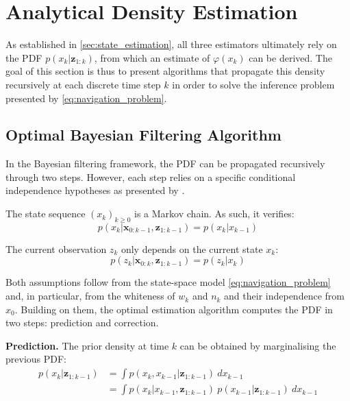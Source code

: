 \section{Analytical Density Estimation}\label{sec:analytical_estimation}

As established in \cref{sec:state_estimation}, all three estimators ultimately rely on the PDF $p(x_k|\mathbf{z}_{1:k})$, from which an estimate of $\varphi(x_k)$ can be derived. The goal of this section is thus to present algorithms that propagate this density recursively at each discrete time step $k$ in order to solve the inference problem presented by \eqref{eq:navigation_problem}.

\subsection{Optimal Bayesian Filtering Algorithm}

In the Bayesian filtering framework, the PDF can be propagated recursively through two steps. However, each step relies on a specific conditional independence hypotheses as presented by .

\begin{assumption}\label{th:Markov}
	The state sequence $(x_k)_{k\geq0}$ is a Markov chain. As such, it verifies:
	\begin{equation}
		p(x_k|\mathbf{x}_{0:k-1},\mathbf{z}_{1:k-1})=p(x_k|x_{k-1})
	\end{equation}
\end{assumption}

\begin{assumption}\label{th:observation_independence}
	The current observation $z_k$ only depends on the current state $x_k$:
	\begin{equation}
		p(z_k|\mathbf{x}_{0:k},\mathbf{z}_{1:k-1})=p(z_k|x_k)
	\end{equation}
\end{assumption}

Both assumptions follow from the state-space model \eqref{eq:navigation_problem} and, in particular, from the whiteness of $w_k$ and $n_k$ and their independence from $x_0$. Building on them, the optimal estimation algorithm computes the PDF in two steps: prediction and correction.

\textbf{Prediction.} The prior density at time $k$ can be obtained by marginalising the previous PDF:
\begin{equation}
	\begin{aligned}
	p(x_k|\mathbf{z}_{1:k-1})&=\int{p(x_k,x_{k-1}|\mathbf{z}_{1:k-1})\:dx_{k-1}}\\
	&=\int{p(x_k|x_{k-1},\mathbf{z}_{1:k-1})\:p(x_{k-1}|\mathbf{z}_{1:k-1})\:dx_{k-1}}
	\end{aligned}\label{eq:pre_Chapman}
\end{equation}

